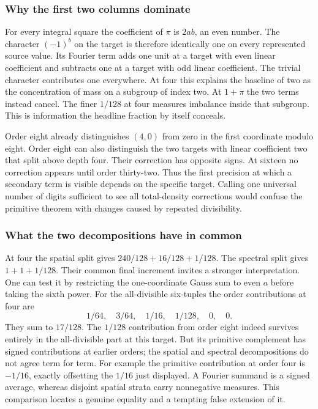 \documentclass[12pt,letterpaper]{article}
\begin{document}
\subsubsection{Why the first two columns dominate}
For every integral square the coefficient of $\pi$ is $2ab$, an even number. The character $(-1)^b$ on the target is therefore identically one on every represented source value. Its Fourier term adds one unit at a target with even linear coefficient and subtracts one at a target with odd linear coefficient. The trivial character contributes one everywhere. At four this explains the baseline of two as the concentration of mass on a subgroup of index two. At $1+\pi$ the two terms instead cancel. The finer $1/128$ at four measures imbalance inside that subgroup. This is information the headline fraction by itself conceals.
\par
Order eight already distinguishes $(4,0)$ from zero in the first coordinate modulo eight. Order eight can also distinguish the two targets with linear coefficient two that split above depth four. Their correction has opposite signs. At sixteen no correction appears until order thirty-two. Thus the first precision at which a secondary term is visible depends on the specific target. Calling one universal number of digits sufficient to see all total-density corrections would confuse the primitive theorem with changes caused by repeated divisibility.
\subsubsection{What the two decompositions have in common}
At four the spatial split gives $240/128+16/128+1/128$. The spectral split gives $1+1+1/128$. Their common final increment invites a stronger interpretation. One can test it by restricting the one-coordinate Gauss sum to even $a$ before taking the sixth power. For the all-divisible six-tuples the order contributions at four are
\[
 1/64,\quad 3/64,\quad 1/16,\quad 1/128,\quad0,\quad0 .
\]
They sum to $17/128$. The $1/128$ contribution from order eight indeed survives entirely in the all-divisible part at this target. But its primitive complement has signed contributions at earlier orders; the spatial and spectral decompositions do not agree term for term. For example the primitive contribution at order four is $-1/16$, exactly offsetting the $1/16$ just displayed. A Fourier summand is a signed average, whereas disjoint spatial strata carry nonnegative measures. This comparison locates a genuine equality and a tempting false extension of it.
\end{document}
